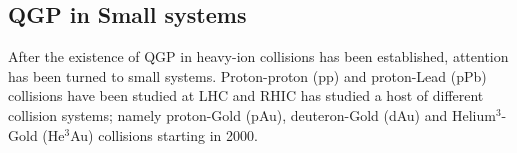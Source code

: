 %
%
%
%
%
%
%
%
%







\subsection{QGP in Small systems}
After the existence of QGP in heavy-ion collisions has been established, attention has been turned to small systems. Proton-proton (pp) and proton-Lead (pPb) collisions have been studied at LHC and RHIC has studied a host of different collision systems; namely proton-Gold (pAu), deuteron-Gold (dAu) and Helium$^3$-Gold (He$^3$Au) collisions starting in 2000. %

